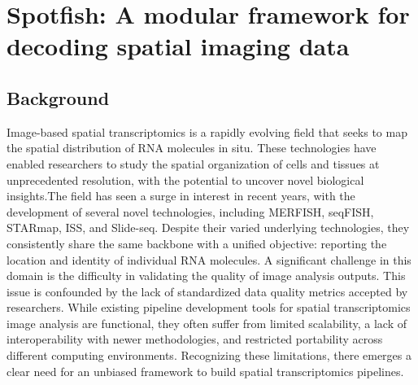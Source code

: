 \chapter{Spotfish: A modular framework for decoding spatial imaging data}\label{chap:chapter 3}


\section{Background}

Image-based spatial transcriptomics is a rapidly evolving field that seeks to map the spatial distribution of RNA molecules in situ. These technologies have enabled researchers to study the spatial organization of cells and tissues at unprecedented resolution, with the potential to uncover novel biological insights.The field has seen a surge in interest in recent years, with the development of several novel technologies, including MERFISH\cite{chenSpatiallyResolvedHighly2015}, seqFISH\cite{shahSeqFISHAccuratelyDetects2017}, STARmap\cite{wangThreedimensionalIntacttissueSequencing2018}, ISS\cite{keSituSequencingRNA2013}, and Slide-seq\cite{rodriquesSlideseqScalableTechnology2019}. Despite their varied underlying technologies, they consistently share the same backbone with a unified objective: reporting the location and identity of individual RNA molecules. A significant challenge in this domain is the difficulty in validating the quality of image analysis outputs. This issue is confounded by the lack of standardized data quality metrics accepted by researchers. While existing pipeline development tools for spatial transcriptomics image analysis are functional, they often suffer from limited scalability, a lack of interoperability with newer methodologies, and restricted portability across different computing environments. Recognizing these limitations, there emerges a clear need for an unbiased framework to build spatial transcriptomics pipelines. 

